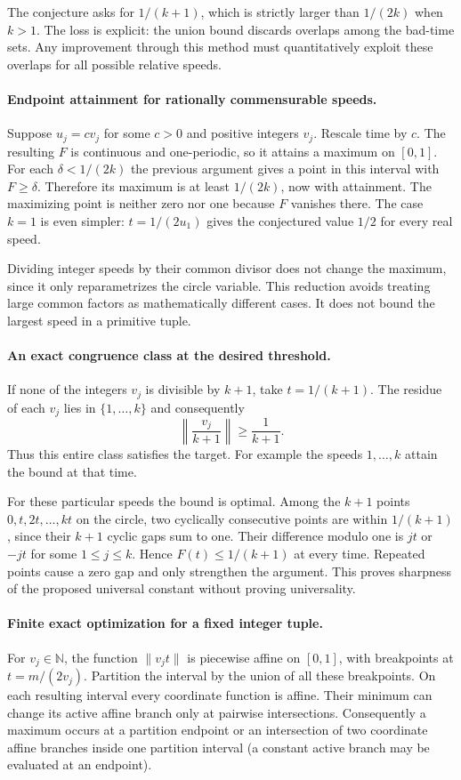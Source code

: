\documentclass[11pt,a4paper]{article}
\begin{document}
The conjecture asks for $1/(k+1)$, which is strictly larger than $1/(2k)$ when $k>1$. The loss is explicit: the union bound discards overlaps among the bad-time sets. Any improvement through this method must quantitatively exploit these overlaps for all possible relative speeds.

\paragraph{Endpoint attainment for rationally commensurable speeds.}
Suppose $u_j=cv_j$ for some $c>0$ and positive integers $v_j$. Rescale time by $c$. The resulting $F$ is continuous and one-periodic, so it attains a maximum on $[0,1]$. For each $\delta<1/(2k)$ the previous argument gives a point in this interval with $F\ge\delta$. Therefore its maximum is at least $1/(2k)$, now with attainment. The maximizing point is neither zero nor one because $F$ vanishes there. The case $k=1$ is even simpler: $t=1/(2u_1)$ gives the conjectured value $1/2$ for every real speed.

Dividing integer speeds by their common divisor does not change the maximum, since it only reparametrizes the circle variable. This reduction avoids treating large common factors as mathematically different cases. It does not bound the largest speed in a primitive tuple.

\paragraph{An exact congruence class at the desired threshold.}
If none of the integers $v_j$ is divisible by $k+1$, take $t=1/(k+1)$. The residue of each $v_j$ lies in $\{1,\ldots,k\}$ and consequently
\[
\left\|\frac{v_j}{k+1}\right\|\ge\frac1{k+1}.
\]
Thus this entire class satisfies the target. For example the speeds $1,\ldots,k$ attain the bound at that time.

For these particular speeds the bound is optimal. Among the $k+1$ points $0,t,2t,\ldots,kt$ on the circle, two cyclically consecutive points are within $1/(k+1)$, since their $k+1$ cyclic gaps sum to one. Their difference modulo one is $jt$ or $-jt$ for some $1\le j\le k$. Hence $F(t)\le1/(k+1)$ at every time. Repeated points cause a zero gap and only strengthen the argument. This proves sharpness of the proposed universal constant without proving universality.

\paragraph{Finite exact optimization for a fixed integer tuple.}
For $v_j\in\mathbb N$, the function $\|v_jt\|$ is piecewise affine on $[0,1]$, with breakpoints at $t=m/(2v_j)$. Partition the interval by the union of all these breakpoints. On each resulting interval every coordinate function is affine. Their minimum can change its active affine branch only at pairwise intersections. Consequently a maximum occurs at a partition endpoint or an intersection of two coordinate affine branches inside one partition interval (a constant active branch may be evaluated at an endpoint).
\end{document}
